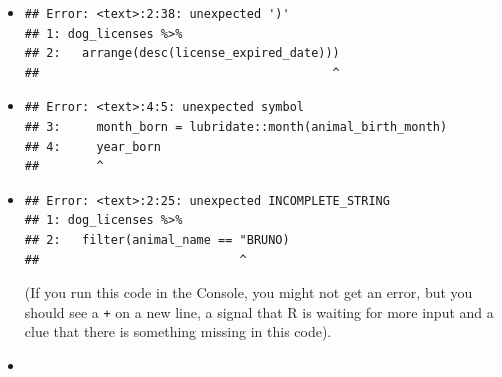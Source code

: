 \documentclass[]{Nemilov}
\newenvironment{Shaded}{\begin{snugshade}}{\end{snugshade}}
\newcommand{\DataTypeTok}[1]{\textcolor[rgb]{0.13,0.29,0.53}{#1}}
\newcommand{\ErrorTok}[1]{\textcolor[rgb]{0.64,0.00,0.00}{\textbf{#1}}}
\newcommand{\KeywordTok}[1]{\textcolor[rgb]{0.13,0.29,0.53}{\textbf{#1}}}
\newcommand{\NormalTok}[1]{#1}
\newcommand{\OperatorTok}[1]{\textcolor[rgb]{0.81,0.36,0.00}{\textbf{#1}}}
\newcommand{\StringTok}[1]{\textcolor[rgb]{0.31,0.60,0.02}{#1}}
\begin{document}
\begin{itemize}
\item
\begin{Shaded}
\end{Shaded}

\begin{verbatim}
## Error: <text>:2:38: unexpected ')'
## 1: dog_licenses %>%
## 2:   arrange(desc(license_expired_date)))
##                                         ^
\end{verbatim}
\item
\begin{Shaded}
\end{Shaded}

\begin{verbatim}
## Error: <text>:4:5: unexpected symbol
## 3:     month_born = lubridate::month(animal_birth_month)
## 4:     year_born
##        ^
\end{verbatim}
\item
\begin{Shaded}
\end{Shaded}

\begin{verbatim}
## Error: <text>:2:25: unexpected INCOMPLETE_STRING
## 1: dog_licenses %>%
## 2:   filter(animal_name == "BRUNO)
##                            ^
\end{verbatim}

  (If you run this code in the Console, you might not get an error, but you should see a \texttt{+} on a new line, a signal that R is waiting for more input and a clue that there is something missing in this code).
\item
\begin{Shaded}
\end{Shaded}


\end{itemize}
\end{document}
